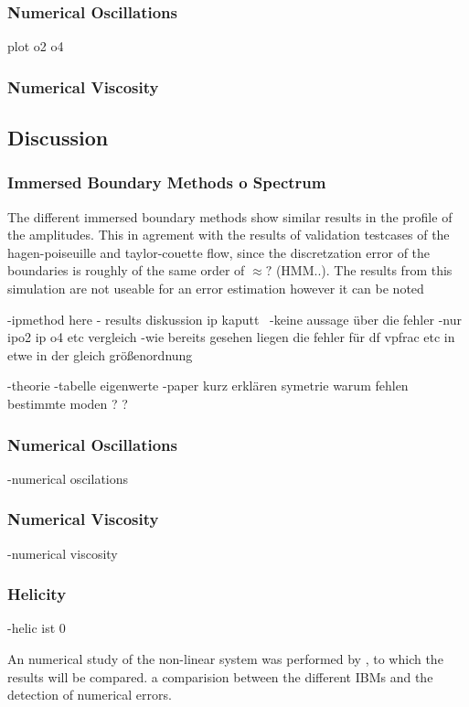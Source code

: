 \subsubsection{Numerical Oscillations}
plot o2 o4
\subsubsection{Numerical Viscosity}

\subsection{Discussion}

\subsubsection{Immersed Boundary Methods o Spectrum}

The different immersed boundary methods show similar results in the profile of the amplitudes.
This in agrement with the results of validation testcases of the hagen-poiseuille and
taylor-couette flow, since the discretzation error of the boundaries is roughly of the same order of $\approx?$ (HMM..).
The results from this simulation are not useable for an error estimation however it can be noted

-ipmethod here
- results diskussion ip kaputt \
-keine aussage über die fehler
-nur ipo2 ip o4 etc vergleich
-wie bereits gesehen liegen die fehler für df vpfrac etc in etwe in der gleich größenordnung

-theorie
-tabelle eigenwerte
-paper kurz erklären symetrie warum fehlen bestimmte moden ? ?
\subsubsection{Numerical Oscillations}
-numerical oscilations
\subsubsection{Numerical Viscosity}
-numerical viscosity
\subsubsection{Helicity}
-helic ist 0

An numerical study of the non-linear system was performed by \citep{BLA}, to which the results will be compared.
a comparision between the different IBMs and the detection of numerical errors.

